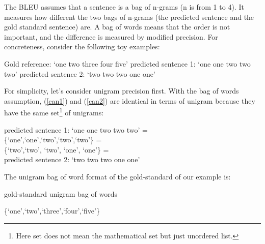 \documentclass[final]{ua-thesis}
\numberwithin{equation}{section}
\begin{document}
The BLEU assumes that a sentence is a bag of n-grams (n is from 1 to 4). It measures how different the two bags of n-grams (the predicted sentence and the gold standard sentence) are. A bag of words means that the order is not important, and the difference is measured by modified precision. For concreteness, consider the following toy examples:

\begin{exe}
\ex 
	\begin{xlist}
	\ex \label{gold1} Gold reference: `one two three four five'
	\ex \label{can1} predicted sentence 1: `one one two two two'
	\ex \label{can2} predicted sentence 2: `two two two one one'
	\end{xlist}
\end{exe}

For simplicity, let's consider unigram precision first. With the bag of words assumption, (\ref{can1}) and (\ref{can2}) are identical in terms of unigram because they have the same set\footnote{Here set does not mean the mathematical set but just unordered list.} of unigrams:   

\begin{exe}
\ex 
	\begin{xlist}
	\ex predicted sentence 1: `one one two two two' =\\
	 \{`one',`one',`two',`two',`two'\}  =\\
	 \{`two',`two', `two', `one', `one'\} =\\
	  predicted sentence 2: `two two two one one'
	\end{xlist}
\end{exe}

The unigram bag of word format of the gold-standard of our example is:

\begin{exe}
\ex gold-standard unigram bag of words
	\begin{xlist}
	\ex \{`one',`two',`three',`four',`five'\}
	\end{xlist}
\end{exe}
\end{document}
